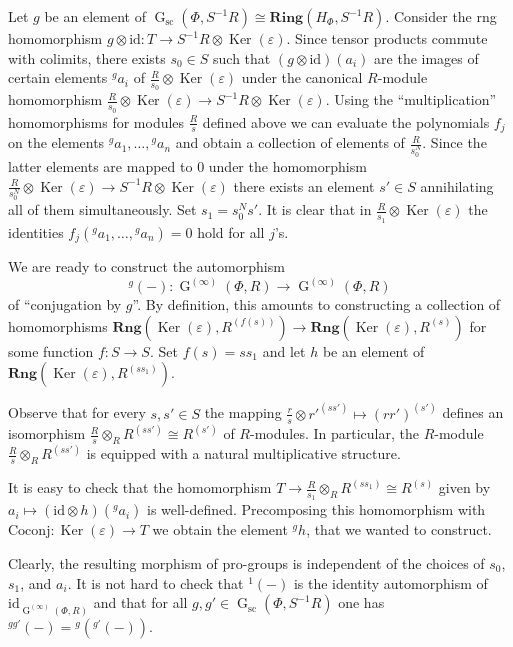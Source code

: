 \documentclass[oneside, 11pt]{amsart}
\numberwithin{equation}{section}
\theoremstyle{definition}
\theoremstyle{remark}
\DeclareMathOperator\Ker{Ker}
\DeclareMathOperator\GG{G}
\newcommand{\Rng}{\mathbf{Rng}}
\newcommand{\up}[2]{{^{#1}\!{#2}}}
\begin{document}
Let $g$ be an element of $\GG_{\mathrm{sc}}(\Phi, S^{-1} R) \cong \mathbf{Ring}(H_\Phi, S^{-1}R)$. Consider the rng homomorphism \(g \otimes \mathrm{id} \colon T \to S^{-1} R \otimes \Ker(\varepsilon)\).
Since tensor products commute with colimits, there exists \(s_0 \in S\) such that \((g \otimes \mathrm{id})(a_i)\) are the images of certain elements $\up g {a_i}$ of $\frac R{s_0} \otimes \Ker(\varepsilon)$ under the canonical $R$-module homomorphism $ \tfrac R{s_0} \otimes \Ker(\varepsilon) \to S^{-1}R \otimes \Ker(\varepsilon).$
Using the ``multiplication'' homomorphisms for modules $\frac R s$ defined above we can evaluate the polynomials $f_j$ on the elements $\up g a_1,\ldots, \up g a_n$ and obtain a collection of elements of $\frac R {s_0^N}$. Since the latter elements are mapped to $0$ under the homomorphism $\frac R {s_0^N} \otimes \Ker(\varepsilon) \to S^{-1}R \otimes \Ker(\varepsilon)$ there exists an element $s' \in S$ annihilating all of them simultaneously. Set $s_1 = s_0^N s'$. It is clear that in $\frac R{s_1} \otimes \Ker(\varepsilon)$ the identities \(f_j(\up g{a_1}, \ldots, \up g{a_n}) = 0\) hold for all \(j\)'s.

We are ready to construct the automorphism
\[\up g{(-)} \colon \GG^{(\infty)}(\Phi, R) \to \GG^{(\infty)}(\Phi, R)\]
of ``conjugation by $g$''. By definition, this amounts to constructing a collection of homomorphisms
$\Rng(\Ker(\varepsilon), R^{(f(s))}) \to \Rng(\Ker(\varepsilon), R^{(s)})$ for some function $f \colon S \to S$. Set $f(s) = ss_1$ and let $h$ be an element of $\Rng(\Ker(\varepsilon), R^{(ss_1)})$.

Observe that for every \(s, s' \in S\) the mapping $ \frac rs \otimes {r'}^{(ss')} \mapsto (rr')^{(s')}$ defines an isomorphism \(\frac Rs \otimes_R R^{(ss')} \cong R^{(s')}\) of $R$-modules. In particular, the \(R\)-module \(\frac Rs \otimes_R R^{(ss')}\) is equipped with a natural multiplicative structure.

It is easy to check that the homomorphism $ T \to \frac R{s_1} \otimes_R R^{(s s_1)} \cong R^{(s)}$ given by $a_i \mapsto (\mathrm{id} \otimes h)(\up g{a_i})$
is well-defined. Precomposing this homomorphism with \(\mathrm{Coconj}\colon \Ker(\varepsilon) \to T\) we obtain the element \(\up gh\), that we wanted to construct.

Clearly, the resulting morphism of pro-groups is independent of the choices of \(s_0\), \(s_1\), and \(a_i\). It is not hard to check that $\up 1{(-)}$ is the identity automorphism of $\mathrm{id}_{\GG^{(\infty)}(\Phi, R)}$ and that for all \(g, g' \in \GG_{\mathrm{sc}}(\Phi, S^{-1} R)\) one has $\up{gg'}{(-)} = \up{g}{(\up{g'}{(-)})}$.
\end{document}
